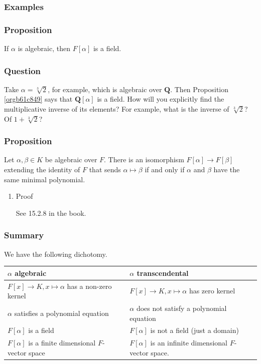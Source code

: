 \documentclass[11pt]{article}
\begin{document}
\subsubsection{Examples}
\label{sec:orgca4f962}
\subsubsection{Proposition}
\label{sec:orgfd06165}
\label{orgb61c849}
If \(\alpha\) is algebraic, then \(F[\alpha]\) is a field.
\subsubsection{Question}
\label{sec:orgf4d2f97}
Take \(\alpha = \sqrt[3]{2}\), for example, which is algebraic over \(\mathbf{Q}\).
Then Proposition \ref{orgb61c849} says that \(\mathbf{Q}[\alpha]\) is a field.
How will you explicitly find the multiplicative inverse of its elements?
For example, what is the inverse of \(\sqrt[3]{2}\)? Of \(1 + \sqrt[3]{2}\)?
\subsubsection{Proposition}
\label{sec:orgaceb78b}

Let \(\alpha, \beta \in K\) be algebraic over \(F\).
There is an isomorphism \(F[\alpha] \to F[\beta]\) extending the identity of \(F\) that sends \(\alpha \mapsto \beta\) if and only if \(\alpha\) and \(\beta\) have the same minimal polynomial.
\begin{enumerate}
\item Proof
\label{sec:orgd8ad9c9}

See 15.2.8 in the book.
\end{enumerate}
\subsubsection{Summary}
\label{sec:org8596bfd}
We have the following dichotomy.
\begin{center}
\begin{tabular}{ll}
\hline
\(\alpha\) algebraic & \(\alpha\) transcendental\\
\hline
\(F[x] \to K, x \mapsto \alpha\) has a non-zero kernel & \(F[x] \to K, x \mapsto \alpha\) has zero kernel\\
\(\alpha\) satisfies a polynomial equation & \(\alpha\) does not satisfy a polynomial equation\\
\(F[\alpha]\) is a field & \(F[\alpha]\) is not a field (just a domain)\\
\(F[\alpha]\) is a finite dimensional \(F\)-vector space & \(F[\alpha]\) is an infinite dimensional \(F\)-vector space.\\
\hline
\end{tabular}
\end{center}
\end{document}
